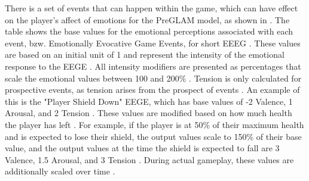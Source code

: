 There is a set of events that can happen within the game, which 
can have effect on the player's affect of emotions for the PreGLAM
model, as shown in . The table shows the base values for the emotional 
perceptions associated with each event, bzw. Emotionally Evocative Game Events, for short EEEG \cite{plut2023preglam}\cite{plut2022preglam}. These values are based on an initial unit of 1 and represent the 
intensity of the emotional response to the EEGE \cite{plut2022preglam}. All intensity modifiers are presented as percentages 
that scale the emotional values between 100 and 200\% \cite{plut2022preglam}. Tension is only calculated for prospective events, as tension arises from the prospect of events \cite{plut2022preglam}. An example of this is the "Player Shield Down"
EEGE, which has base values of -2 Valence, 1 Arousal, and 2 Tension \cite{plut2022preglam}. These values are modified based on 
how much health the player has left \cite{plut2022preglam}. For example, if the player is at 50\% of their maximum health and 
is expected to lose their shield, the output values scale to 150\% of their base value, and the output
values at the time the shield is expected to fall are 3 Valence, 1.5 Arousal, and 3 Tension \cite{plut2022preglam}. During 
actual gameplay, these values are additionally scaled over time \cite{plut2022preglam}.




